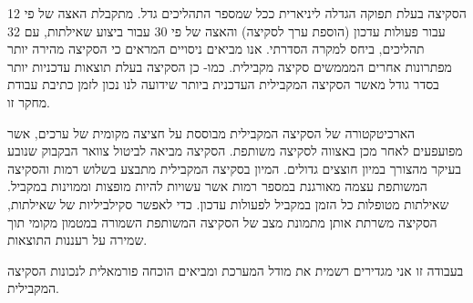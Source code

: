 {הסקיצה בעלת תפוקה הגדלה ליניארית ככל שמספר התהליכים גדל. מתקבלת האצה של פי 12 עבור פעולות עדכון (הוספת ערך לסקיצה) והאצה של פי 30 עבור ביצוע שאילתות, עם 32 תהליכים, ביחס למקרה הסדרתי. אנו מביאים ניסויים המראים כי הסקיצה מהירה יותר מפתרונות אחרים המממשים סקיצה מקבילית. כמו- כן הסקיצה בעלת תוצאות עדכניות יותר בסדר גודל מאשר הסקיצה המקבילית העדכנית ביותר שידועה לנו נכון לזמן כתיבת עבודת מחקר זו. 

הארכיטקטורה של הסקיצה המקבילית מבוססת על חציצה מקומית של ערכים, אשר מפועפעים לאחר מכן באצווה לסקיצה משותפת. הסקיצה מביאה לביטול צוואר הבקבוק שנובע בעיקר מהצורך במיון חוצצים גדולים. המיון בסקיצה המקבילית מתבצע בשלוש רמות והסקיצה המשותפת עצמה מאורגנת במספר רמות אשר עשויות להיות מופצות וממוינות במקביל. שאילתות מטופלות כל הזמן במקביל לפעולות עדכון. כדי לאפשר סקילביליות של שאילתות, הסקיצה משרתת אותן מתמונת מצב של הסקיצה המשותפת השמורה במטמון מקומי תוך שמירה על רעננות התוצאות. 

בעבודה זו אני מגדירים רשמית את מודל המערכת ומביאים הוכחה פורמאלית לנכונות הסקיצה המקבילית.
} %